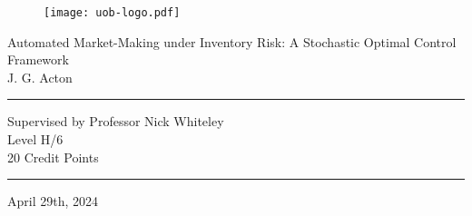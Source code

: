 \thispagestyle{plain}
\begin{titlepage}
    \begin{figure}[h]
        \begin{center}
            \texttt{[image: uob-logo.pdf]} 
        \end{center}
    \end{figure}

    \begin{center}
        {\Large Automated Market-Making under Inventory Risk: A Stochastic Optimal Control Framework\\ \vspace{1cm}J. G. Acton}
    \end{center}

    \vspace{3cm}
    \hrule
    \begin{center}
        Supervised by Professor Nick Whiteley\\
        Level H/6\\
        20 Credit Points\\
        \vspace{4mm}
    \end{center}
    \hrule

    \vspace{3cm}
    \begin{center}
        April 29th, 2024
    \end{center}
\end{titlepage}